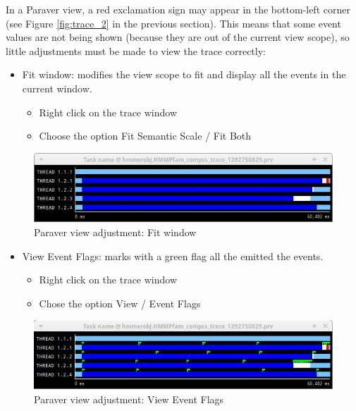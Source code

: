 In a Paraver view, a red exclamation sign may appear in the bottom-left corner (see Figure \ref{fig:trace_2} in the previous section). This
means that some event values are not being shown (because they are out of the current view scope), so little adjustments must be made to
view the trace correctly:

\begin{itemize}
 \item Fit window: modifies the view scope to fit and display all the events in the current window.
	\begin{itemize}
	    \item Right click on the trace window
	    \item Choose the option Fit Semantic Scale / Fit Both
	\end{itemize}
\end{itemize}

\begin{figure}[ht!]
  \centering
    \includegraphics[width=1.0\textwidth]{./Sections/3_Visualization/Figures/3.jpeg}
    \caption{Paraver view adjustment: Fit window}
\end{figure}

\begin{itemize} 
 \item View Event Flags: marks with a green flag all the emitted the events.
	\begin{itemize}
	    \item Right click on the trace window
	    \item Chose the option View / Event Flags
	\end{itemize}
\end{itemize}
 
\begin{figure}[ht!]
  \centering
    \includegraphics[width=1.0\textwidth]{./Sections/3_Visualization/Figures/4.jpeg}
    \caption{Paraver view adjustment: View Event Flags}
\end{figure}

